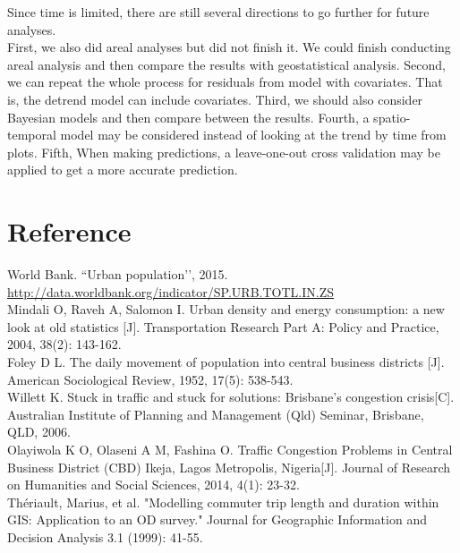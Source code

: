 \documentclass[hidelinks,12pt]{article}
\begin{document}
	Since time is limited, there are still several directions to go further for future analyses.\\
	
	 First, we also did areal analyses but did not finish it. We could finish conducting areal analysis and then compare the results with geostatistical analysis.	Second, we can repeat the whole process for residuals from model with covariates. That is, the detrend model can include covariates.	Third, we should also consider Bayesian models and then compare between the results. Fourth, a spatio-temporal model may be considered instead of looking at the trend by time from plots. Fifth, When making predictions, a leave-one-out cross validation may be applied to get a more accurate prediction.
		
	\section{Reference}\label{sec:ref}
	\noindent World Bank. “Urban population’’, 2015.\\
	\url{http://data.worldbank.org/indicator/SP.URB.TOTL.IN.ZS}\\
	
	\noindent Mindali O, Raveh A, Salomon I. Urban density and energy consumption: a new look at old statistics [J]. Transportation Research Part A: Policy and Practice, 2004, 38(2): 143-162.\\
	
	\noindent Foley D L. The daily movement of population into central business districts [J]. American Sociological Review, 1952, 17(5): 538-543.\\
	
	\noindent Willett K. Stuck in traffic and stuck for solutions: Brisbane’s congestion crisis[C]. Australian Institute of Planning and Management (Qld) Seminar, Brisbane, QLD, 2006.\\
	
	\noindent Olayiwola K O, Olaseni A M, Fashina O. Traffic Congestion Problems in Central Business District (CBD) Ikeja, Lagos Metropolis, Nigeria[J]. Journal of Research on Humanities and Social Sciences, 2014, 4(1): 23-32.\\
	
	\noindent Thériault, Marius, et al. "Modelling commuter trip length and duration within GIS: Application to an OD survey." Journal for Geographic Information and Decision Analysis 3.1 (1999): 41-55.\\
	
\end{document}
